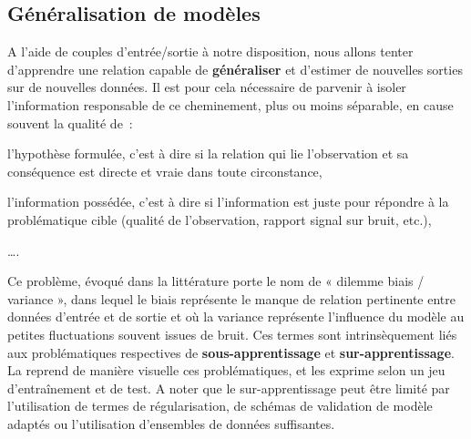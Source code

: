 \subsection{Généralisation de modèles}
\label{subsec:generalized_models}
A l'aide de couples d'entrée/sortie à notre disposition, nous allons tenter d’apprendre une relation capable de \textbf{généraliser} et d’estimer de nouvelles sorties sur de nouvelles données. Il est pour cela nécessaire de parvenir à isoler l'information responsable de ce cheminement, plus ou moins séparable, en cause souvent la qualité de~:
\begin{inlinerate}
    \item l'hypothèse formulée, c'est à dire si la relation qui lie l'observation et sa conséquence est directe et vraie dans toute circonstance,
    \item l'information possédée, c'est à dire si l'information est juste pour répondre à la problématique cible (qualité de l'observation, rapport signal sur bruit, etc.),
    \item \ldots.
\end{inlinerate}\par 

Ce problème, évoqué dans la littérature porte le nom de « dilemme biais / variance », dans lequel le biais représente le manque de relation pertinente entre données d’entrée et de sortie et où la variance représente l’influence du modèle au petites fluctuations souvent issues de bruit. Ces termes sont intrinsèquement liés aux problématiques respectives de \textbf{sous-apprentissage} et \textbf{sur-apprentissage}. La  reprend de manière visuelle ces problématiques, et les exprime selon un jeu d’entraînement et de test. A noter que le sur-apprentissage peut être limité par l’utilisation de termes de régularisation, de schémas de validation de modèle adaptés ou l’utilisation d’ensembles de données suffisantes.\par
 
